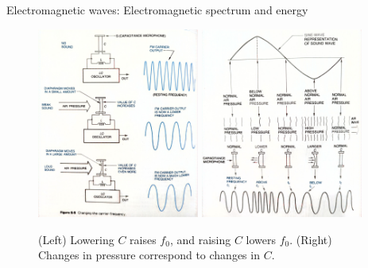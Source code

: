 \documentclass{beamer}
\begin{document}
\begin{frame}{Electromagnetic waves: Electromagnetic spectrum and energy}
\begin{figure}
\centering
\includegraphics[width=0.475\textwidth]{figures/FMSpec2.pdf}
\includegraphics[width=0.475\textwidth]{figures/FMSpec3.pdf}
\caption{\label{fig:radio3} \footnotesize (Left) Lowering $C$ raises $f_0$, and raising $C$ lowers $f_0$. (Right) Changes in pressure correspond to changes in $C$.}
\end{figure}
\end{frame}
\end{document}
